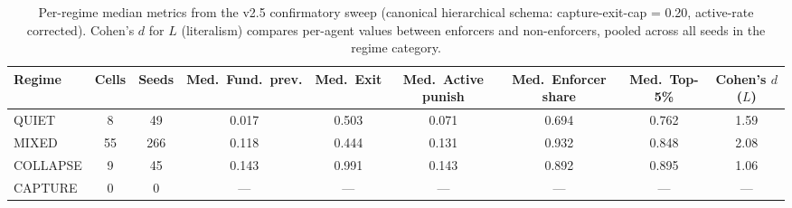 \begin{table}[ht]
\centering
\caption{Per-regime median metrics from the v2.5 confirmatory sweep (canonical hierarchical schema: capture-exit-cap = 0.20, active-rate corrected). Cohen's $d$ for $L$ (literalism) compares per-agent values between enforcers and non-enforcers, pooled across all seeds in the regime category.}
\label{tab:6}
\begin{tabular}{lcccccccc}
\toprule
Regime & Cells & Seeds & Med.\ Fund.\ prev. & Med.\ Exit & Med.\ Active punish & Med.\ Enforcer share & Med.\ Top-5\% & Cohen's $d$ ($L$) \\
\midrule
QUIET & 8 & 49 & 0.017 & 0.503 & 0.071 & 0.694 & 0.762 & 1.59 \\
MIXED & 55 & 266 & 0.118 & 0.444 & 0.131 & 0.932 & 0.848 & 2.08 \\
COLLAPSE & 9 & 45 & 0.143 & 0.991 & 0.143 & 0.892 & 0.895 & 1.06 \\
CAPTURE & 0 & 0 & — & — & — & — & — & — \\
\bottomrule
\end{tabular}
\end{table}
